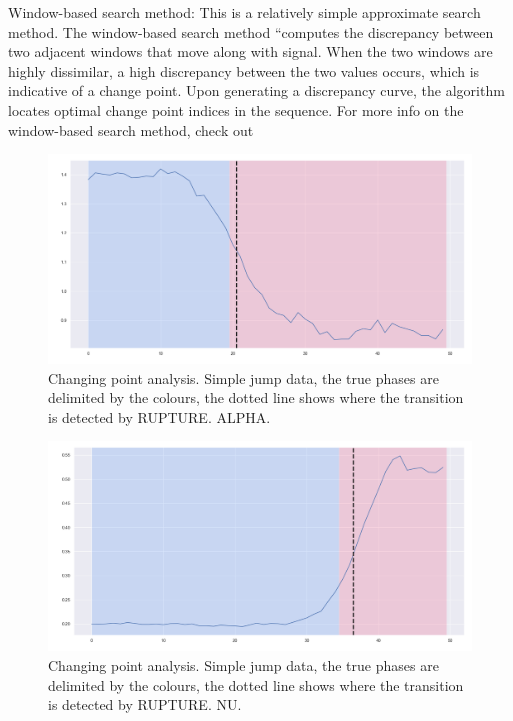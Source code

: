 Window-based search method: This is a relatively simple approximate search method. The window-based search method “computes the discrepancy between two adjacent windows that move along with signal. When the two windows are highly dissimilar, a high discrepancy between the two values occurs, which is indicative of a change point. Upon generating a discrepancy curve, the algorithm locates optimal change point indices in the sequence. For more info on the window-based search method, check out \cite{rupture_docu}



\begin{figure}
\centering
\includegraphics[width = 0.90 \textwidth]{../imag/chap4/Figure_2.png}
\caption{Changing point analysis. Simple jump data, the true phases are delimited by the colours, the dotted line shows where the transition is detected by RUPTURE. ALPHA.}
\label{fig:changing_point_2}
\end{figure}



\begin{figure}
\centering
\includegraphics[width = 0.90 \textwidth]{../imag/chap4/Figure_4.png}
\caption{Changing point analysis. Simple jump data, the true phases are delimited by the colours, the dotted line shows where the transition is detected by RUPTURE. NU.}
\label{fig:changing_point_4}
\end{figure}




